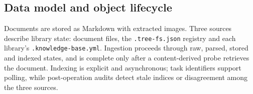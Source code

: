 \subsection{Data model and object lifecycle}
\label{sec:datamodel}
\label{sec:lifecycle}

Documents are stored as Markdown with extracted images. Three sources describe
library state: document files, the \texttt{.tree-fs.json} registry and each
library's \texttt{.knowledge-base.yml}. Ingestion proceeds through raw,
parsed, stored and indexed states, and is complete only after a content-derived
probe retrieves the document. Indexing is explicit and asynchronous; task
identifiers support polling, while post-operation audits detect stale indices
or disagreement among the three sources.
